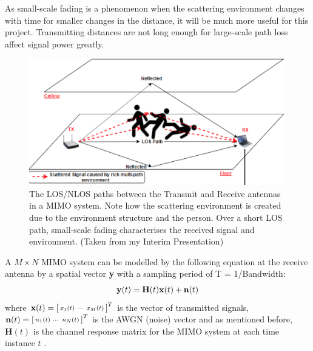 As small-scale fading is a phenomenon when the scattering environment changes with time for smaller changes in the distance, it will be much more useful for this project. Transmitting distances are not long enough for large-scale path loss affect signal power greatly. \par
\begin{figure}[h]
\begin{center}
  \includegraphics[scale=0.75]{Figures/Reflection.png}
\end{center}
  \caption{The LOS/NLOS paths between the Transmit and Receive antennas in a MIMO system. Note how the scattering environment is created due to the environment structure and the person. Over a short LOS path, small-scale fading characterises the received signal and environment. (Taken from my Interim Presentation)}
  \vspace{-10pt}
  \label{fig:LOS_NLOS}
\end{figure}
A $M\times N$ MIMO system can be modelled by the following equation at the receive antenna by a spatial vector \textbf{y} with a sampling period of T = 1/Bandwidth:
\vspace{-11pt}
\begin{equation}\label{eqn:2.1}
    \textbf{y}(t) = \textbf{H}(t)\textbf{x}(t)+\textbf{n}(t)
    \vspace{-11pt}
\end{equation}
where  $\textbf{x}(t) = \begin{bsmallmatrix}x_1(t) & \cdots & x_M(t)\end{bsmallmatrix}^T$ is the vector of transmitted signals, $\textbf{n}(t) = \begin{bsmallmatrix}n_1(t) & \cdots & n_N(t)\end{bsmallmatrix}^T$ is the AWGN (noise) vector and as mentioned before, $\textbf{H}(t)$ is the channel response matrix for the MIMO system at each time instance $t$ \citep{channelEquations}. \par
